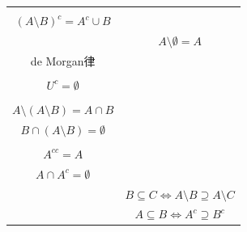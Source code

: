 \documentclass[a4paper]{jsarticle}
\begin{document}
\begin{thm}
\begin{longtable}[c]{|c|c|}
\hline
& \hspace{-0.5em}\begin{tabular}{c}
  $A^{c} \setminus B = (A \cup B)^{c} $\\
  $(A \setminus B)^{c} = A^{c} \cup B$ \end{tabular} \\
\hline
& $A \setminus \emptyset = A$ \\
\hline
\multirow{2}{*}{de Morgan律} & \hspace{-0.5em}\begin{tabular}{c}
  $\emptyset \setminus A = \emptyset $ \\
  $A \setminus A = \emptyset$ \end{tabular}\\ \cline{2-2}
& \hspace{-0.5em}\begin{tabular}{c}
  $\emptyset^{c} = U$ \\
  $U^{c} = \emptyset$ \end{tabular} \\
\hline
& \hspace{-0.5em}\begin{tabular}{c}
  $B \cup (A \setminus B) = A \cup B$\\
  $A \setminus (A \setminus B) = A \cap B$\\
  $B \cap (A \setminus B) = \emptyset$ \end{tabular} \\ \cline{2-2}
& \hspace{-0.5em}\begin{tabular}{c}
  $A \cup A^{c} = U$\\
  $A^{cc} = A$\\
  $A \cap A^{c} = \emptyset$ \end{tabular} \\
\hline
& $B \subseteq C \Leftrightarrow A \setminus B \supseteq A \setminus C$ \\ \cline{2-2}
& $A \subseteq B \Leftrightarrow A^{c} \supseteq B^{c}$ \\
\hline
\end{longtable}
\end{thm}
\end{document}
